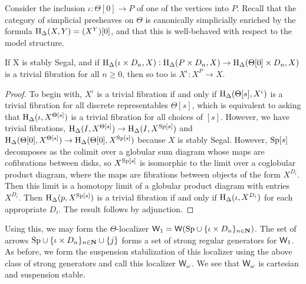 Consider the inclusion \(\iota:\Theta[0]\to P\) of one of the vertices into \(P\).   Recall that the category of simplicial presheaves on \(\Theta\) is canonically simplicially enriched by the formula \(\operatorname{H}_\Delta(X,Y)=(X^Y)[0]\), and that this is well-behaved with respect to the model structure.  

\begin{lemma}
If X is stably Segal, and if \(\operatorname{H}_\Delta(\iota \times D_n, X): \operatorname{H}_\Delta(P\times D_n,X) \to \operatorname{H}_\Delta(\Theta[0]\times D_n, X)\) is a trivial fibration for all \(n\geq 0\), then so too is \(X^\iota:X^P\to X\). 
\end{lemma}
\begin{proof}
To begin with, \(X^\iota\) is a trivial fibration if and only if \(\operatorname{H}_\Delta(\Theta[s],X^\iota)\) is a trivial fibration for all discrete representables \(\Theta[s]\), which is equivalent to asking that \(\operatorname{H}_\Delta(\iota, X^{\Theta[s]})\) is a trivial fibration for all choices of \([s]\).  However, we have trivial fibrations, \(\operatorname{H}_\Delta(I,X^{\Theta[s]}) \to \operatorname{H}_\Delta(I,X^{{\operatorname{Sp}}[s]})\) and \(\operatorname{H}_\Delta(\Theta[0],X^{\Theta[s]}) \to \operatorname{H}_\Delta(\Theta[0],X^{{\operatorname{Sp}}[s]})\) because \(X\) is stably Segal.  However, \({\operatorname{Sp}}[s]\) decomposes as the colimit over a globular sum diagram whose maps are cofibrations between disks, so \(X^{{\operatorname{Sp}}[s]}\) is isomorphic to the limit over a coglobular product diagram, where the maps are fibrations between objects of the form \(X^{D_i}\).  Then this limit is a homotopy limit of a globular product diagram with entries \(X^{D_i}\).  Then \(\operatorname{H}_\Delta(p,X^{{\operatorname{Sp}}[s]}) \) is a trivial fibration if and only if \(\operatorname{H}_\Delta(\iota,X^{D_i})\) for each appropriate \(D_i\).  The result follows by adjunction.
\end{proof}

Using this, we may form the \(\Theta\)-localizer \(\mathsf{W}_1=\mathsf{W}({\operatorname{Sp}} \cup \{\iota \times D_n\}_{n\in \mathbf{N}})\).  The set of arrows \({\operatorname{Sp}} \cup \{\iota \times D_n\}_{n\in \mathbf{N}} \cup \{j\}\) forms a set of strong regular generators for \(\mathsf{W}_1\).  As before, we form the suspension stabilization of this localizer using the above class of strong generators and call this localizer \(\mathsf{W}_\omega\).  We see that \(\mathsf{W}_\omega\) is cartesian and suspension stable.  

